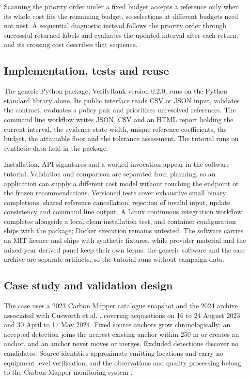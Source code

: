 \documentclass[a4paper,fleqn,longmktitle]{cas-sc}
\begin{document}
Scanning the priority order under a fixed budget accepts a reference only when its whole cost fits the remaining budget, so selections at different budgets need not nest. A sequential diagnostic instead follows the priority order through successful returned labels and evaluates the updated interval after each return, and its crossing cost describes that sequence.

\subsection{Implementation, tests and reuse}\label{sec:implementation}

The generic Python package, VerifyRank version 0.2.0, runs on the Python standard library alone. Its public interface reads CSV or JSON input, validates the contract, evaluates a policy pair and prioritises unresolved references. The command line workflow writes JSON, CSV and an HTML report holding the current interval, the evidence state width, unique reference coefficients, the budget, the attainable floor and the tolerance assessment. The tutorial runs on synthetic data held in the package.

Installation, API signatures and a worked invocation appear in the software tutorial. Validation and comparison are separated from planning, so an application can supply a different cost model without touching the endpoint or the frozen recommendations. Versioned tests cover exhaustive small binary completions, shared reference cancellation, rejection of invalid input, update consistency and command line output. A Linux continuous integration workflow completes alongside a local clean installation test, and container configuration ships with the package; Docker execution remains untested. The software carries an MIT licence and ships with synthetic fixtures, while provider material and the mixed year derived panel keep their own terms; the generic software and the case archive are separate artifacts, so the tutorial runs without campaign data.

\subsection{Case study and validation design}\label{sec:case}

The case uses a 2023 Carbon Mapper catalogue snapshot and the 2024 archive associated with Cusworth et al. \citep{cusworth2026}, covering acquisitions on 16 to 24 August 2023 and 30 April to 17 May 2024. Fixed source anchors grow chronologically: an accepted detection joins the nearest existing anchor within 250 m or creates an anchor, and an anchor never moves or merges. Excluded detections discover no candidates. Source identities approximate emitting locations and carry no equipment level verification, and the observations and quality processing belong to the Carbon Mapper monitoring system \citep{duren2025}.
\end{document}
